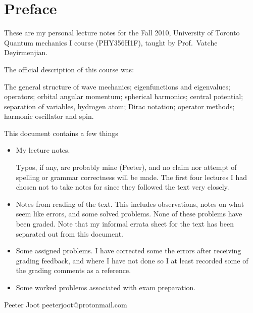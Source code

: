 %
%

% 
% 
\chapter*{Preface}%

These are my personal lecture notes for the Fall 2010, University of Toronto Quantum mechanics I course (PHY356H1F), taught by Prof.\ Vatche Deyirmenjian.

The official description of this course was:

The general structure of wave mechanics; eigenfunctions and eigenvalues; operators; orbital angular momentum; spherical harmonics; central potential; separation of variables, hydrogen atom; Dirac notation; operator methods; harmonic oscillator and spin.

This document contains a few things

\begin{itemize}
\item My lecture notes.

Typos, if any, are probably mine (Peeter), and no claim nor attempt of spelling or grammar correctness will be made.  The first four lectures I had chosen not to take notes for since they followed the text \citep{desai2009quantum} very closely.

\item Notes from reading of the text.  This includes observations, notes on what seem like errors, and some solved problems.  None of these problems have been graded.  Note that my informal errata sheet \citep{desaiTypos} for the text has been separated out from this document.

\item Some assigned problems.  I have corrected some the errors after receiving grading feedback, and where I have not done so I at least recorded some of the grading comments as a reference.

\item Some worked problems associated with exam preparation.

\end{itemize}

Peeter Joot  \quad peeterjoot@protonmail.com 
